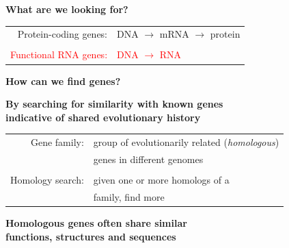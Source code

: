 \documentclass[landscape]{slides}
\begin{document}
\begin{slide}
\begin{center}
\textbf{What are we looking for?}
\end{center}
\medskip

\begin{center}
\begin{tabular}{rl}
Protein-coding genes: & DNA $\rightarrow$ mRNA $\rightarrow$ protein \\
& \\
\textcolor{red}{Functional RNA genes:} & \textcolor{red}{DNA $\rightarrow$ RNA}
\end{tabular}
\medskip

\medskip

\medskip

\medskip

\medskip

\textbf{How can we find genes?}

{\bf By searching for similarity with known genes \\
indicative of shared evolutionary history}

\begin{tabular}{rl}
Gene family: & group of evolutionarily related ({\em homologous}) \\
& genes in different genomes \\
& \\
Homology search: & given one or more homologs of a \\
& family, find more \\
\end{tabular}


{\bf Homologous genes often share similar \\ functions, structures and
  sequences}

\end{center}

\vfill
\end{slide}
\end{document}
